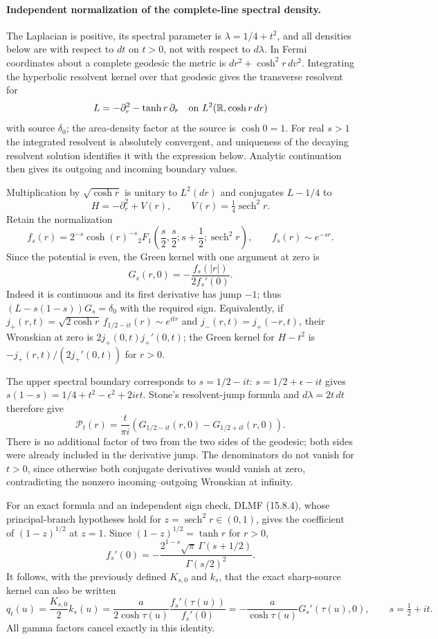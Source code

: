 \paragraph{Independent normalization of the complete-line spectral density.}
The Laplacian is positive, its spectral parameter is
$\lambda=1/4+t^2$, and all densities below are with respect to
$dt$ on $t>0$, not with respect to $d\lambda$.
In Fermi coordinates about a complete geodesic the metric is
$dr^2+\cosh^2r\,dv^2$.  Integrating the hyperbolic resolvent
kernel over that geodesic gives the transverse resolvent for
\[
 L=-\partial_r^2-\tanh r\,\partial_r
 \quad\hbox{on }L^2(\mathbb R,\cosh r\,dr)
\]
with source $\delta_0$; the area-density factor at the source
is $\cosh0=1$.  For real $s>1$ the integrated resolvent is
absolutely convergent, and uniqueness of the decaying resolvent
solution identifies it with the expression below.  Analytic
continuation then gives its outgoing and incoming boundary values.

Multiplication by $\sqrt{\cosh r}$ is unitary to $L^2(dr)$ and
conjugates $L-1/4$ to
\[
 H=-\partial_r^2+V(r),\qquad
 V(r)=\tfrac14\operatorname{sech}^2r.
\]
Retain the normalization
\[
 f_s(r)=2^{-s}\cosh(r)^{-s}
 {}_2F_1\!\left(\frac s2,\frac s2;s+\frac12;\operatorname{sech}^2r\right),
 \qquad f_s(r)\sim e^{-sr}.
\]
Since the potential is even, the Green kernel with one argument at
zero is
\[
 G_s(r,0)=-\frac{f_s(|r|)}{2f_s'(0)}.
\]
Indeed it is continuous and its first derivative has jump $-1$;
thus $(L-s(1-s))G_s=\delta_0$ with the required sign.  Equivalently,
if $j_+(r,t)=\sqrt{2\cosh r}\,f_{1/2-it}(r)\sim e^{itr}$
and $j_-(r,t)=j_+(-r,t)$, their Wronskian at zero is
$2j_+(0,t)j_+'(0,t)$; the Green kernel for $H-t^2$ is
$-j_+(r,t)/(2j_+'(0,t))$ for $r>0$.

The upper spectral boundary corresponds to $s=1/2-it$:
$s=1/2+\epsilon-it$ gives
$s(1-s)=1/4+t^2-\epsilon^2+2i\epsilon t$.
Stone's resolvent-jump formula and $d\lambda=2t\,dt$ therefore give
\[
 \boxed{\quad
 \mathcal P_t(r)=\frac{t}{\pi i}
 \left(G_{1/2-it}(r,0)-G_{1/2+it}(r,0)\right).
 \quad}
\]
There is no additional factor of two from the two sides of the
geodesic; both sides were already included in the derivative jump.
The denominators do not vanish for $t>0$, since otherwise both
conjugate derivatives would vanish at zero, contradicting the
nonzero incoming--outgoing Wronskian at infinity.

For an exact formula and an independent sign check, DLMF (15.8.4),
whose principal-branch hypotheses hold for
$z=\operatorname{sech}^2r\in(0,1)$, gives the coefficient of
$(1-z)^{1/2}$ at $z=1$.  Since
$(1-z)^{1/2}=\tanh r$ for $r>0$,
\[
 f_s'(0)=-\frac{2^{1-s}\sqrt\pi\,\Gamma(s+1/2)}{\Gamma(s/2)^2}.
\]
It follows, with the previously defined $K_{s,0}$ and $k_s$, that
the exact sharp-source kernel can also be written
\[
 q_t(u)=\frac{K_{s,0}}2 k_s(u)
       =\frac{a}{2\cosh\tau(u)}
          \frac{f_s'(\tau(u))}{f_s'(0)}
       =-\frac{a}{\cosh\tau(u)}G_s'(\tau(u),0),
 \qquad s=\tfrac12+it.
\]
All gamma factors cancel exactly in this identity.

